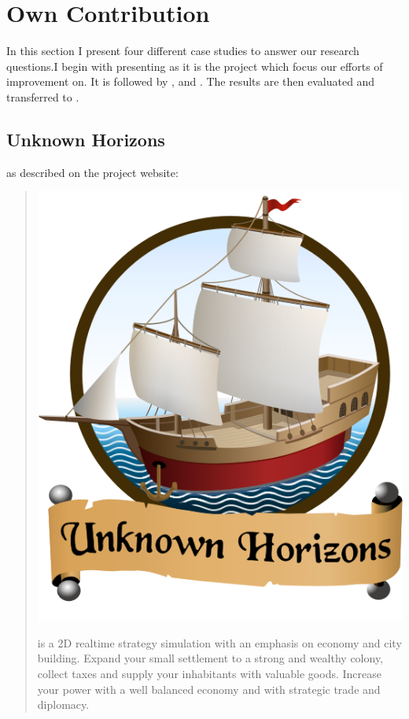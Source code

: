\pagebreak
\section{Own Contribution}
In this section I present four different case studies to answer our research questions.I begin with presenting
\UH{} as it is the project which focus our efforts of improvement on. It is followed by \BOW{}, \GLEST{} and \AD{}.
The results are then evaluated and transferred to \UH{}.

\subsection{Unknown Horizons}
\UH{} as described on the project website:
\begin{quote}

\begin{center}\includegraphics[scale=0.2]{pics/uhlogo}\end{center}

\UH{} is a 2D realtime strategy simulation with an emphasis on economy and city building. Expand your small settlement to a strong and wealthy colony, collect taxes and supply your inhabitants with valuable goods. Increase your power with a well balanced economy and with strategic trade and diplomacy.
\end{quote}

